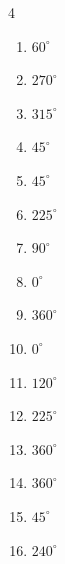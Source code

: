 \begin{multicols}{4}
\begin{enumerate}
  \item $\displaystyle 60^{\circ}$

  \item $\displaystyle 270^{\circ}$

\columnbreak %

  \item $\displaystyle 315^{\circ}$

  \item $\displaystyle 45^{\circ}$

  \item $\displaystyle 45^{\circ}$

  \item $\displaystyle 225^{\circ}$

  \item $\displaystyle 90^{\circ}$

  \item $\displaystyle 0^{\circ}$
        \phantom{$\displaystyle =0$}

  \item $\displaystyle 360^{\circ}$
        \phantom{$\displaystyle =2\pi$}

  \item $\displaystyle 0^{\circ}$
        \phantom{$\displaystyle =0$}

  \item $\displaystyle 120^{\circ}$

  \item $\displaystyle 225^{\circ}$

  \item $\displaystyle 360^{\circ}$
        \phantom{$\displaystyle =2\pi$}

  \item $\displaystyle 360^{\circ}$
        \phantom{$\displaystyle =2\pi$}

  \item $\displaystyle 45^{\circ}$

  \item $\displaystyle 240^{\circ}$


\end{enumerate}
\end{multicols}
